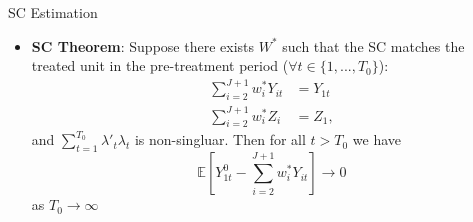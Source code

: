 \documentclass[hyperref={pdfpagelabels=false}]{beamer}
\begin{document}
\begin{frame}{SC Estimation}
\begin{itemize}
\item \textbf{SC Theorem}: Suppose there exists $W^*$ such that the SC matches the treated unit in the pre-treatment period ($\forall t\in\{1,...,T_0\}$): 
\begin{align*}
\sum^{J+1}_{i=2}w^*_{i}Y_{it}&=Y_{1t} \\
\sum^{J+1}_{i=2}w^*_{i}Z_i&=Z_1,
\end{align*}
and $\sum^{T_0}_{t=1}\lambda'_t\lambda_t$ is non-singluar. Then for all $t>T_0$ we have
\begin{equation*}
\mathbb{E}\left[Y^0_{1t}-\sum^{J+1}_{i=2}w^*_{i}Y_{it}\right]\rightarrow 0
\end{equation*}
as $T_0\rightarrow\infty$ 

\end{itemize}
\end{frame}
\end{document}
